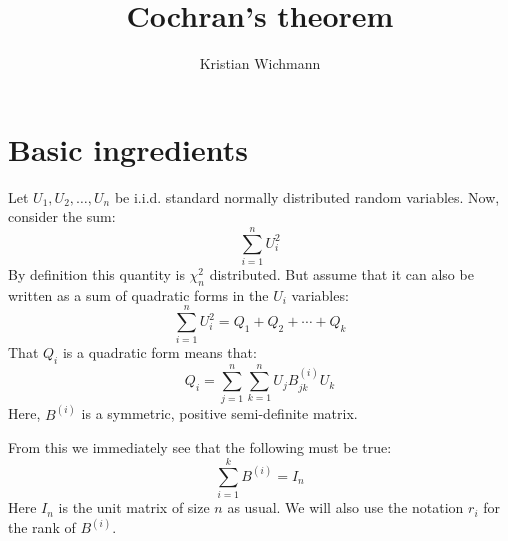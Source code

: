 \documentclass[12pt, a4paper]{article}
\title{Cochran's theorem}
\author{Kristian Wichmann}
\begin{document}
\maketitle

\section{Basic ingredients}
\label{ingredients}
Let $U_1, U_2, \ldots , U_n$ be i.i.d. standard normally distributed random variables. Now, consider the sum:
\begin{equation}
\sum_{i=1}^n U_i^2
\end{equation}
By definition this quantity is $\chi^2_n$ distributed. But assume that it can also be written as a sum of quadratic forms in the $U_i$ variables:
\begin{equation}
\sum_{i=1}^n U_i^2 = Q_1 + Q_2 + \cdots + Q_k
\end{equation}
That $Q_i$ is a quadratic form means that:
\begin{equation}
Q_i=\sum_{j=1}^n\sum_{k=1}^n U_j B^{(i)}_{jk}U_k
\end{equation} 
Here, $B^{(i)}$ is a symmetric, positive semi-definite matrix.\par
From this we immediately see that the following must be true:
\begin{equation}
\label{b_sum}
\sum_{i=1}^k B^{(i)}=I_n
\end{equation}
Here $I_n$ is the unit matrix of size $n$ as usual. We will also use the notation $r_i$ for the rank of $B^{(i)}$.
\end{document}
